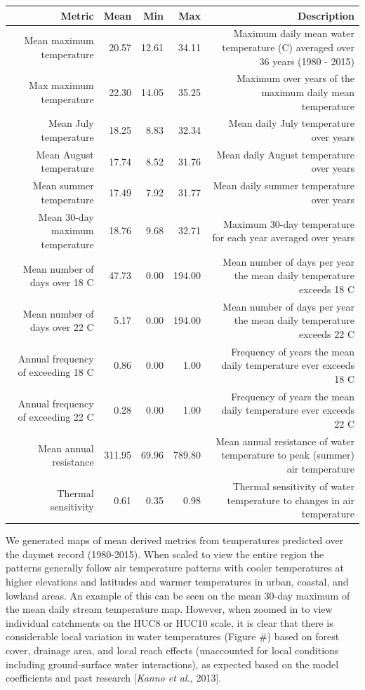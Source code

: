 \begin{longtable}[c]{@{}rrrrr@{}}
\toprule
Metric & Mean & Min & Max & Description\tabularnewline
\midrule
\endhead
Mean maximum temperature & 20.57 & 12.61 & 34.11 & Maximum daily mean
water temperature (C) averaged over 36 years (1980 -
2015)\tabularnewline
Max maximum temperature & 22.30 & 14.05 & 35.25 & Maximum over years of
the maximum daily mean temperature\tabularnewline
Mean July temperature & 18.25 & 8.83 & 32.34 & Mean daily July
temperature over years\tabularnewline
Mean August temperature & 17.74 & 8.52 & 31.76 & Mean daily August
temperature over years\tabularnewline
Mean summer temperature & 17.49 & 7.92 & 31.77 & Mean daily summer
temperature over years\tabularnewline
Mean 30-day maximum temperature & 18.76 & 9.68 & 32.71 & Maximum 30-day
temperature for each year averaged over years\tabularnewline
Mean number of days over 18 C & 47.73 & 0.00 & 194.00 & Mean number of
days per year the mean daily temperature exceeds 18 C\tabularnewline
Mean number of days over 22 C & 5.17 & 0.00 & 194.00 & Mean number of
days per year the mean daily temperature exceeds 22 C\tabularnewline
Annual frequency of exceeding 18 C & 0.86 & 0.00 & 1.00 & Frequency of
years the mean daily temperature ever exceeds 18 C\tabularnewline
Annual frequency of exceeding 22 C & 0.28 & 0.00 & 1.00 & Frequency of
years the mean daily temperature ever exceeds 22 C\tabularnewline
Mean annual resistance & 311.95 & 69.96 & 789.80 & Mean annual
resistance of water temperature to peak (summer) air
temperature\tabularnewline
Thermal sensitivity & 0.61 & 0.35 & 0.98 & Thermal sensitivity of water
temperature to changes in air temperature\tabularnewline
\bottomrule
\end{longtable}

We generated maps of mean derived metrics from temperatures predicted
over the daymet record (1980-2015). When scaled to view the entire
region the patterns generally follow air temperature patterns with
cooler temperatures at higher elevations and latitudes and warmer
temperatures in urban, coastal, and lowland areas. An example of this
can be seen on the mean 30-day maximum of the mean daily stream
temperature map. However, when zoomed in to view individual catchments
on the HUC8 or HUC10 scale, it is clear that there is considerable local
variation in water temperatures (Figure \#) based on forest cover,
drainage area, and local reach effects (unaccounted for local conditions
including ground-surface water interactions), as expected based on the
model coefficients and past research {[}\emph{Kanno et al.}, 2013{]}.

